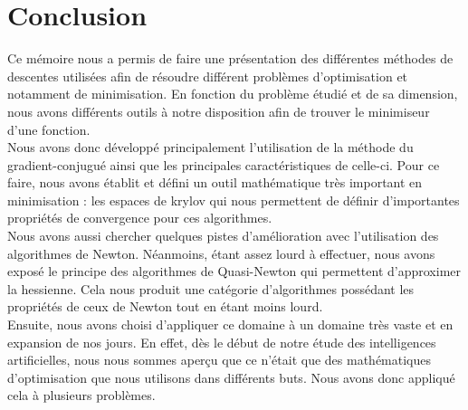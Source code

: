 \chapter{Conclusion}

Ce mémoire nous a permis de faire une présentation des différentes méthodes de descentes utilisées afin de résoudre différent problèmes d'optimisation et notamment de minimisation. En fonction du problème étudié et de sa dimension, nous avons différents outils à notre disposition afin de trouver le minimiseur d'une fonction. \\

Nous avons donc développé principalement l'utilisation de la méthode du gradient-conjugué ainsi que les principales caractéristiques de celle-ci. Pour ce faire, nous avons établit et défini un outil mathématique très important en minimisation : les espaces de krylov qui nous permettent de définir d'importantes propriétés de convergence pour ces algorithmes.\\

 Nous avons aussi chercher quelques pistes d'amélioration avec l'utilisation des algorithmes de Newton. Néanmoins, étant assez lourd à effectuer, nous avons exposé le principe des algorithmes de Quasi-Newton qui permettent d'approximer la hessienne. Cela nous produit une catégorie d'algorithmes possédant les propriétés de ceux de Newton tout en étant moins lourd.\\

Ensuite, nous avons choisi d'appliquer ce domaine à un domaine très vaste et en expansion de nos jours. En effet, dès le début de notre étude des intelligences artificielles, nous nous sommes aperçu que ce n'était que des mathématiques d'optimisation que nous utilisons dans différents buts. Nous avons donc appliqué cela à plusieurs problèmes. 